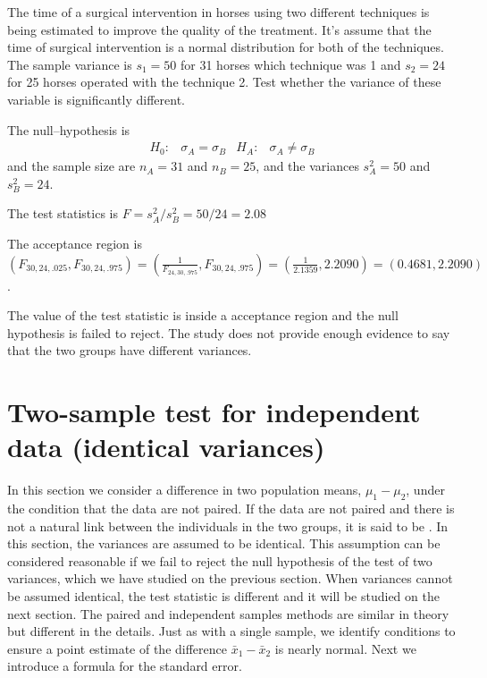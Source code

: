 \begin{examplewrap}
  \begin{nexample}{
The time of a surgical  intervention in horses using two different
techniques is being estimated to improve the quality of the treatment. It's assume that the time of surgical intervention is a
normal distribution for both of the techniques.  The sample variance
is $s_1=50$ for 31 horses which technique was 1 and $s_2=24$ for 25
horses operated with the technique 2. Test whether the variance of
these variable is significantly different. 
}

The null--hypothesis is 
\begin{align*}
H_0: &   \sigma_A=\sigma_B & H_A:&\sigma_A\neq\sigma_B
\end{align*}
 and 
    the sample size are $n_A=31$ and $n_B=25$, and the variances
    $s^2_A=50$ and $s^2_B=24$.

The test statistics is $F=s^2_A/s^2_B=50/24= 2.08$ 

The acceptance region is
$(F_{30,24,.025},F_{30,24,.975})=(\frac{1}{F_{24,30,.975}},F_{30,24,.975})=(\frac{1}{2.1359},2.2090)=(0.4681,2.2090)$.
 
The value of the test statistic is inside a acceptance region and the
null hypothesis is failed to reject. The study does not provide enough evidence to say that the two groups have different variances.  

\end{nexample}
\end{examplewrap}


\section[Two-sample test for independent data with identical variances]{Two-sample test for independent data (identical variances)}
\label{differenceOfTwoMeansEqualVar}


In this section we consider a difference in two population means, $\mu_1 - \mu_2$, under the condition that the data are not paired. If the data are not paired and there is not a natural link between the individuals in the two groups, it is said to be . In this section, the variances are assumed to be identical. This assumption can be considered reasonable if we fail to reject the null hypothesis of the test of two variances, which we have studied on the previous section. When variances cannot be assumed identical, the test statistic is different and it will be studied on the next section.  The paired and independent samples methods are similar in theory but different in the details. Just as with a single sample, we identify conditions to ensure a point estimate of the difference $\bar{x}_1 - \bar{x}_2$ is nearly normal. Next we introduce a formula for the standard error. 

